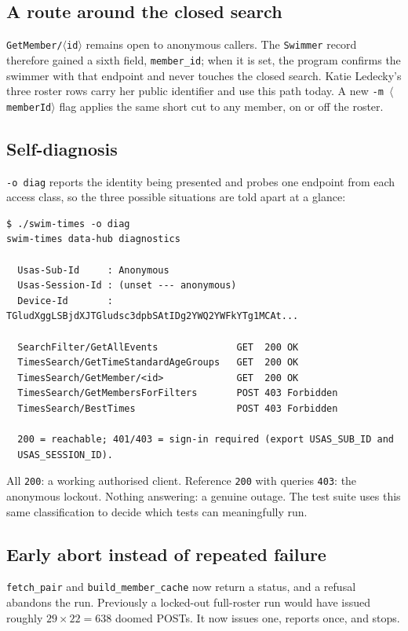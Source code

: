 \documentclass[11pt]{article}
\newcommand{\code}[1]{\texttt{#1}}
\begin{document}
\subsection{A route around the closed search}

\code{GetMember/$\langle$id$\rangle$} remains open to anonymous
callers.  The \code{Swimmer} record therefore gained a sixth field,
\code{member\_id}; when it is set, the program confirms the swimmer
with that endpoint and never touches the closed search.  Katie
Ledecky's three roster rows carry her public identifier and use this
path today.  A new \code{-m $\langle$memberId$\rangle$} flag applies the
same short cut to any member, on or off the roster.

\subsection{Self-diagnosis}

\code{-o diag} reports the identity being presented and probes one
endpoint from each access class, so the three possible situations are
told apart at a glance:

\begin{lstlisting}
$ ./swim-times -o diag
swim-times data-hub diagnostics

  Usas-Sub-Id     : Anonymous
  Usas-Session-Id : (unset --- anonymous)
  Device-Id       : TGludXggLSBjdXJTGludsc3dpbSAtIDg2YWQ2YWFkYTg1MCAt...

  SearchFilter/GetAllEvents              GET  200 OK
  TimesSearch/GetTimeStandardAgeGroups   GET  200 OK
  TimesSearch/GetMember/<id>             GET  200 OK
  TimesSearch/GetMembersForFilters       POST 403 Forbidden
  TimesSearch/BestTimes                  POST 403 Forbidden

  200 = reachable; 401/403 = sign-in required (export USAS_SUB_ID and
  USAS_SESSION_ID).
\end{lstlisting}

\noindent All \code{200}: a working authorised client.  Reference
\code{200} with queries \code{403}: the anonymous lockout.  Nothing
answering: a genuine outage.  The test suite uses this same
classification to decide which tests can meaningfully run.

\subsection{Early abort instead of repeated failure}

\code{fetch\_pair} and \code{build\_member\_cache} now return a status,
and a refusal abandons the run.  Previously a locked-out full-roster
run would have issued roughly $29 \times 22 = 638$ doomed POSTs.  It now
issues one, reports once, and stops.
\end{document}
